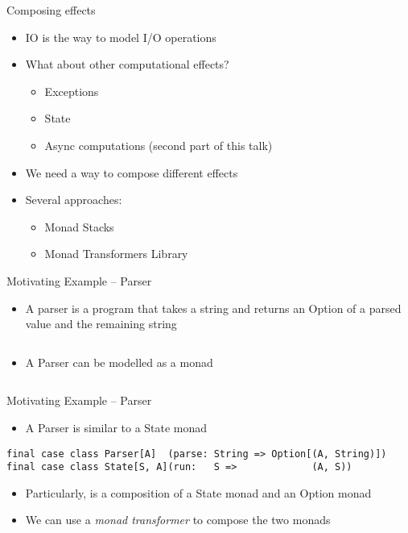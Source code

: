 \documentclass[presentation, 10pt]{beamer}\mode<presentation>{\usetheme{AMSBolognaFC}}
\begin{document}
\begin{frame}{Composing effects}
\begin{itemize}
	\item IO is the way to model I/O operations
	\item What about other computational effects?
	\begin{itemize}
		\item Exceptions
		\item State
		\item Async computations (second part of this talk)
	\end{itemize}
	\item We need a way to compose different effects
	\item Several approaches:
	\begin{itemize}
		\item Monad Stacks
		\item Monad Transformers Library
	\end{itemize}
\end{itemize}
\end{frame}
\begin{frame}[fragile]{Motivating Example -- Parser}
\begin{itemize}
	\item A parser is a program that takes a string and returns an Option of a parsed value and the remaining string
\end{itemize}
\inputminted[firstline=5, lastline=5]{scala}{code/src/main/scala/scala/monads/Parser.scala}
\begin{itemize}
	\item A Parser can be modelled as a monad
\end{itemize}
\inputminted[firstline=7, lastline=17]{scala}{code/src/main/scala/scala/monads/Parser.scala}

\end{frame}
\begin{frame}[fragile]{Motivating Example -- Parser}
\begin{itemize}
	\item A Parser is similar to a State monad
\end{itemize}
\begin{tcolorbox}
\begin{verbatim}
final case class Parser[A]  (parse: String => Option[(A, String)]) 
final case class State[S, A](run:   S =>             (A, S))
\end{verbatim}
\end{tcolorbox}
\begin{itemize}
	\item Particularly, is a composition of a State monad and an Option monad
	\item We can use a \emph{monad transformer} to compose the two monads
\end{itemize}
\end{frame}
\end{document}
